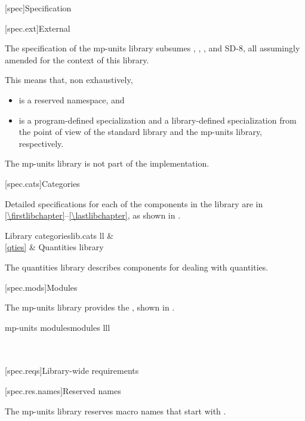 [spec]{Specification}

[spec.ext]{External}

\pnum
The specification of the mp-units library subsumes
, , , and SD-8,
all assumingly amended for the context of this library.
\begin{note}
This means that, non exhaustively,
\begin{itemize}
\item {} is a reserved namespace, and
\item
{}
is a program-defined specialization and a library-defined specialization
from the point of view of the \Cpp{} standard library and the mp-units library, respectively.
\end{itemize}
\end{note}

\pnum
The mp-units library is not part of the \Cpp{} implementation.

[spec.cats]{Categories}

\pnum
Detailed specifications for each of the components in the library are in
\ref{\firstlibchapter}--\ref{\lastlibchapter},
as shown in .

\begin{floattable}{Library categories}{lib.cats}
{ll}
\topline
{}        &                               \\ \capsep
\ref{qties}             & Quantities library                              \\
\end{floattable}

\pnum
The quantities library
describes components for dealing with quantities.

[spec.mods]{Modules}

\pnum
The mp-units library provides the
,
shown in .

\begin{multicolfloattable}{mp-units modules}{modules}
{lll}
                      \\
\columnbreak
{}                 \\
\columnbreak
{}              \\
\end{multicolfloattable}

[spec.reqs]{Library-wide requirements}

[spec.res.names]{Reserved names}

\pnum
The mp-units library reserves macro names that start with
.

